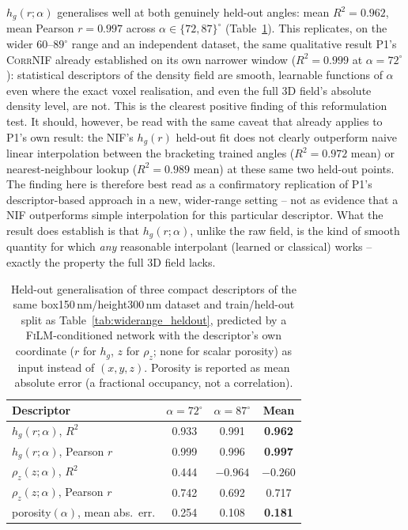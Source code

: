 \documentclass[aip,amsmath,amssymb,reprint]{revtex4-1}
\renewcommand{\ang}{\ensuremath{\alpha}} %
\newcommand{\film}{\textsc{FiLM}}
\begin{document}
$h_g(r;\ang)$ generalises well at both genuinely held-out angles:
mean $R^2=0.962$, mean Pearson $r=0.997$ across $\ang\in\{72,87\}^{\circ}$
(Table~\ref{tab:descriptor_heldout}). This replicates, on the wider
$60$--$89^{\circ}$ range and an independent dataset, the same
qualitative result P1's \textsc{CorrNIF} already established on its
own narrower window ($R^2=0.999$ at $\ang=72^{\circ}$): statistical
descriptors of the density field are smooth, learnable functions of
$\ang$ even where the exact voxel realisation, and even the full
3D field's absolute density level, are not. This is the clearest
positive finding of this reformulation test. It should, however, be
read with the same caveat that already applies to P1's own result: the
NIF's $h_g(r)$ held-out fit does not clearly outperform naive linear
interpolation between the bracketing trained angles ($R^2=0.972$ mean)
or nearest-neighbour lookup ($R^2=0.989$ mean) at these same two held-out
points. The finding here is therefore best read as a confirmatory
replication of P1's descriptor-based approach in a new, wider-range
setting -- not as evidence that a NIF outperforms simple interpolation
for this particular descriptor. What the result does establish is that
$h_g(r;\ang)$, unlike the raw field, is the kind of smooth quantity for
which \emph{any} reasonable interpolant (learned or classical) works --
exactly the property the full 3D field lacks.

\begin{table}[htbp]
  \centering
  \caption{%
    Held-out generalisation of three compact descriptors of the same
    box150\,nm/height300\,nm dataset and train/held-out split as
    Table~\ref{tab:widerange_heldout}, predicted by a \film{}-conditioned
    network with the descriptor's own coordinate ($r$ for $h_g$, $z$ for
    $\rho_z$; none for scalar porosity) as input instead of $(x,y,z)$.
    Porosity is reported as mean absolute error (a fractional occupancy,
    not a correlation).
  }
  \label{tab:descriptor_heldout}
  \begin{tabular}{lccc}
    \toprule
    Descriptor & $\ang=72^{\circ}$ & $\ang=87^{\circ}$ & Mean \\
    \midrule
    $h_g(r;\ang)$, $R^2$ & 0.933 & 0.991 & \textbf{0.962} \\
    $h_g(r;\ang)$, Pearson $r$ & 0.999 & 0.996 & \textbf{0.997} \\
    \addlinespace
    $\rho_z(z;\ang)$, $R^2$ & 0.444 & $-0.964$ & $-0.260$ \\
    $\rho_z(z;\ang)$, Pearson $r$ & 0.742 & 0.692 & 0.717 \\
    \addlinespace
    porosity$(\ang)$, mean abs.\ err. & 0.254 & 0.108 & \textbf{0.181} \\
    \bottomrule
  \end{tabular}
\end{table}
\end{document}
